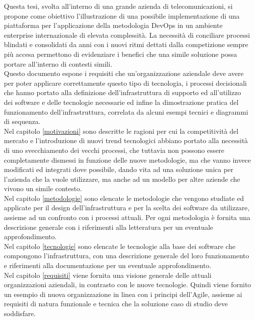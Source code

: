 \documentclass[a4paper, 12pt]{report}
\numberwithin{equation}{section}
\begin{document}
Questa tesi, svolta all'interno di una grande azienda di telecomunicazioni, si propone come obiettivo l'illustrazione di una possibile implementazione di una piattaforma per l'applicazione della metodologia DevOps in un ambiente enterprise internazionale di elevata complessità. La necessità di conciliare processi blindati e consolidati da anni con i nuovi ritmi dettati dalla competizione sempre più accesa permettono di evidenziare i benefici che una simile soluzione possa portare all'interno di contesti simili.\\
Questo documento espone i requisiti che un'organizzazione aziendale deve avere per poter applicare correttamente questo tipo di tecnologia, i processi decisionali che hanno portato alla definizione dell'infrastruttura di supporto ed all'utilizzo dei software e delle tecnologie necessarie ed infine la dimostrazione pratica del funzionamento dell'infrastruttura, correlata da alcuni esempi tecnici e diagrammi di sequenza.\\
Nel capitolo \ref{motivazioni} sono descritte le ragioni per cui la competitività del mercato e l'introduzione di nuovi trend tecnologici abbiano portato alla necessità di uno svecchiamento dei vecchi processi, che tuttavia non possono essere completamente dismessi in funzione delle nuove metodologie, ma che vanno invece modificati ed integrati dove possibile, dando vita ad una soluzione unica per l'azienda che la vuole utilizzare, ma anche ad un modello per altre aziende che vivono un simile contesto.\\
Nel capitolo \ref{metodologie} sono elencate le metodologie che vengono studiate ed applicate per il design dell'infrastruttura e per la scelta dei software da utilizzare, assieme ad un confronto con i processi attuali. Per ogni metodologia è fornita una descrizione generale con i riferimenti alla letteratura per un eventuale approfondimento.\\
Nel capitolo \ref{tecnologie} sono elencate le tecnologie alla base dei software che compongono l'infrastruttura, con una descrizione generale del loro funzionamento e riferimenti alla documentazione per un eventuale approfondimento.\\
Nel capitolo \ref{requisiti} viene fornita una visione generale delle attuali organizzazioni aziendali, in contrasto con le nuove tecnologie. Quindi viene fornito un esempio di nuova organizzazione in linea con i principi dell'Agile, assieme ai requisiti di natura funzionale e tecnica che la soluzione caso di studio deve soddisfare.\\
\end{document}

